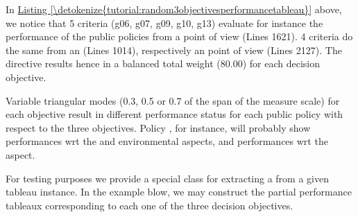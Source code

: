 \documentclass[a4paper,12pt,english]{sphinxhowto}
\begin{document}
In \hyperref[\detokenize{tutorial:random3objectivesperformancetableau}]{Listing \ref{\detokenize{tutorial:random3objectivesperformancetableau}}} above, we notice that 5  criteria (g06, g07, g09, g10, g13) evaluate for instance the performance of the public policies from a  point of view (Lines 16\sphinxhyphen{}21). 4  criteria do the same from an  (Lines 10\sphinxhyphen{}14), respectively an  point of view (Lines 21\sphinxhyphen{}27). The  directive results hence in a balanced total weight (80.00) for each decision objective.

\begin{sphinxVerbatim}[commandchars=\\\{\},numbers=left,firstnumber=1,stepnumber=1]
\end{sphinxVerbatim}

Variable triangular modes (0.3, 0.5 or 0.7 of the span of the measure scale) for each objective result in different performance status for each public policy with respect to the three objectives. Policy , for instance, will probably show  performances wrt the   and environmental aspects, and  performances wrt the  aspect.

For testing purposes we provide a special  class for extracting a  from a given tableau instance. In the example blow, we may construct the partial performance tableaux corresponding to each one of the three decision objectives.
\end{document}
